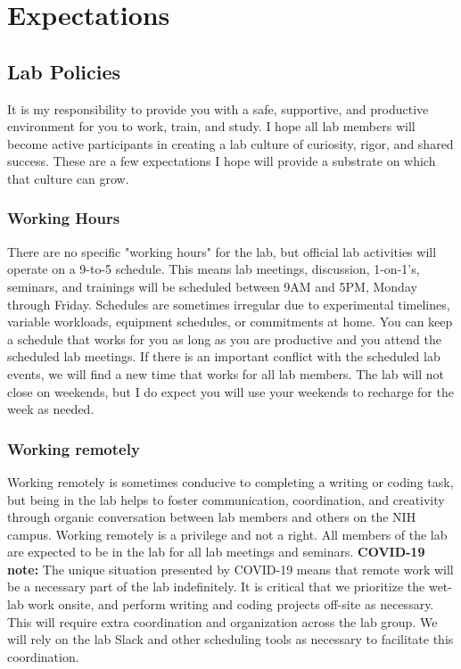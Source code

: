 \documentclass[10pt, letterpaper, twocolumn]{article} %
\begin{document}
\section{Expectations}
\subsection{Lab Policies}
It is my responsibility to provide you with a safe, supportive, and productive environment for you to work, train, and study. I hope all lab members will become active participants in creating a lab culture of curiosity, rigor, and shared success. These are a few expectations I hope will provide a substrate on which that culture can grow.

\subsubsection{Working Hours}
There are no specific "working hours" for the lab, but official lab activities will operate on a 9-to-5 schedule. This means lab meetings, discussion, 1-on-1's, seminars, and trainings will be scheduled between 9AM and 5PM, Monday through Friday. Schedules are sometimes irregular due to experimental timelines, variable workloads, equipment schedules, or commitments at home. You can keep a schedule that works for you as long as you are productive and you attend the scheduled lab meetings. If there is an important conflict with the scheduled lab events, we will find a new time that works for all lab members. The lab will not close on weekends, but I do expect you will use your weekends to recharge for the week as needed.

\subsubsection{Working remotely} Working remotely is sometimes conducive to completing a writing or coding task, but being in the lab helps to foster communication, coordination, and creativity through organic conversation between lab members and others on the NIH campus. Working remotely is a privilege and not a right. All members of the lab are expected to be in the lab for all lab meetings and seminars. {\bfseries COVID-19 note:} The unique situation presented by COVID-19 means that remote work will be a necessary part of the lab indefinitely. It is critical that we prioritize the wet-lab work onsite, and perform writing and coding projects off-site as necessary. This will require extra coordination and organization across the lab group. We will rely on the lab Slack and other scheduling tools as necessary to facilitate this coordination.
\end{document}
